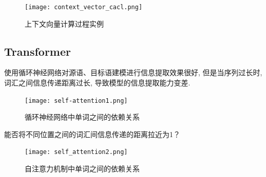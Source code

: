\begin{figure}[htp]
    \centering
\texttt{[image: context\_vector\_cacl.png]}
    \caption{上下文向量计算过程实例}
    \end{figure}

\subsection{Transformer}
使用循环神经网络对源语、目标语建模进行信息提取效果很好, 但是当序列过长时, 词汇之间信息传递距离过长, 导致模型的信息提取能力变差. 
\begin{figure}[htp]
    \centering
    \texttt{[image: self-attention1.png]}
    \caption{循环神经网络中单词之间的依赖关系}
    \end{figure}
 能否将不同位置之间的词汇间信息传递的距离拉近为1？ 
 \begin{figure}[htp]
    \centering
    \texttt{[image: self\_attention2.png]}
    \caption{自注意力机制中单词之间的依赖关系}
    \end{figure}



